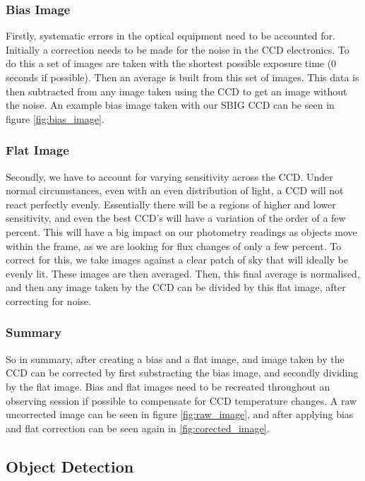 \subsubsection{Bias Image}

Firstly, systematic errors in the optical equipment need to be accounted for. Initially a correction needs to be made for the noise in the CCD electronics. To do this a set of images are taken with the shortest possible exposure time (0 seconds if possible). Then an average is built from this set of images. This data is then subtracted from any image taken using the CCD to get an image without the noise. An example bias image taken with our SBIG CCD can be seen in figure \ref{fig:bias_image}.

\subsubsection{Flat Image}

Secondly, we have to account for varying sensitivity across the CCD. Under normal circumstances, even with an even distribution of light, a CCD will not react perfectly evenly. Essentially there will be a regions of higher and lower sensitivity, and even the best CCD's will have a variation of the order of a few percent. This will have a big impact on our photometry readings as objects move within the frame, as we are looking for flux changes of only a few percent. To correct for this, we take images against a clear patch of sky that will ideally be evenly lit. These images are then averaged. Then, this final average is normalised, and then any image taken by the CCD can be divided by this flat image, after correcting for noise.

\subsubsection{Summary}

So in summary, after creating a bias and a flat image, and image taken by the CCD can be corrected by first substracting the bias image, and secondly dividing by the flat image. Bias and flat images need to be recreated throughout an observing session if possible to compensate for CCD temperature changes. A raw uncorrected image can be seen in figure \ref{fig:raw_image}, and after applying bias and flat correction can be seen again in \ref{fig:corected_image}.

\subsection{Object Detection}

